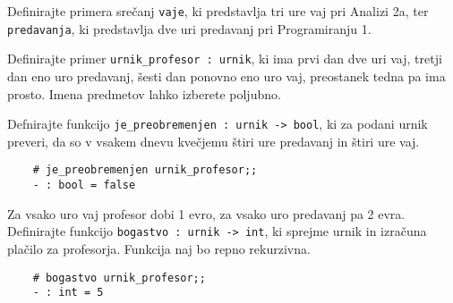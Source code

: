 \documentclass[arhiv]{../izpit}
\begin{document}
	\podnaloga Definirajte primera srečanj \verb|vaje|, ki predstavlja tri ure vaj pri Analizi 2a, ter \verb|predavanja|, ki predstavlja dve uri predavanj pri Programiranju 1.
	
	\podnaloga Definirajte primer \verb|urnik_profesor : urnik|, ki ima prvi dan dve uri vaj, tretji dan eno uro predavanj, šesti dan ponovno eno uro vaj, preostanek tedna pa ima prosto. Imena predmetov lahko izberete poljubno.
	
	\podnaloga Defnirajte funkcijo \verb|je_preobremenjen : urnik -> bool|, ki za podani urnik preveri, da so v vsakem dnevu kvečjemu štiri ure predavanj in štiri ure vaj.
	
	\begin{verbatim}
	# je_preobremenjen urnik_profesor;;
	- : bool = false
	\end{verbatim}
	
	\podnaloga Za vsako uro vaj profesor dobi 1 evro, za vsako uro predavanj pa 2 evra. Definirajte funkcijo \verb|bogastvo : urnik -> int|, ki sprejme urnik in izračuna plačilo za profesorja. Funkcija naj bo repno rekurzivna.
	
	\begin{verbatim}
	# bogastvo urnik_profesor;;
	- : int = 5
	\end{verbatim}
	
	
\end{document}
